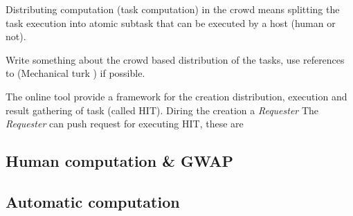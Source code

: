 Distributing computation (task computation) in the crowd means splitting
the task execution into atomic subtask that can be executed by a host
(human or not).

Write something about the crowd based distribution of the tasks, use references
to (Mechanical turk \cite{little2010turkit}) if possible.

The online tool  provide a framework for the creation
distribution, execution and result gathering of task (called \ac{HIT}).
Diring the creation a \emph{Requester} 
The \emph{Requester} can push request for executing \ac{HIT}, these are 

\subsection{Human computation \& \ac{GWAP}}
\label{sec:bg:crowd:human}


\subsection{Automatic computation}
\label{sec:bg:crowd:auto}
